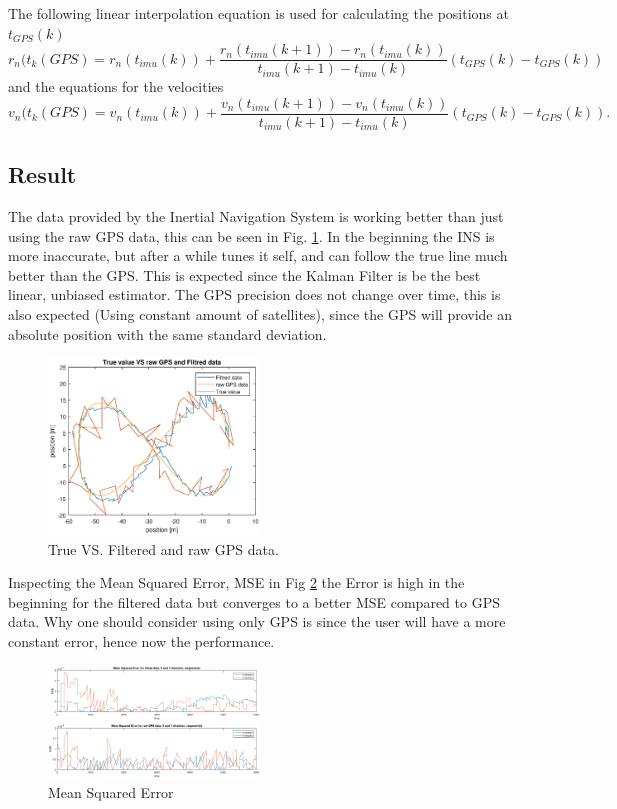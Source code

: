 The following linear interpolation equation is used for calculating the positions at $t_{GPS}(k)$
\begin{equation}
r_n(t_k(GPS) = r_n(t_{imu}(k)) + \frac{r_n(t_{imu}(k+1))-r_n(t_{imu}(k))}{t_{imu}(k+1)-t_{imu}(k)}(t_{GPS}(k)-t_{GPS}(k))
\end{equation}
 and the equations for the velocities 
 \begin{equation}
v_n(t_k(GPS) = v_n(t_{imu}(k)) + \frac{v_n(t_{imu}(k+1))-v_n(t_{imu}(k))}{t_{imu}(k+1)-t_{imu}(k)}(t_{GPS}(k)-t_{GPS}(k)).
\end{equation}
\subsection{Result}
The data provided by the Inertial Navigation System is working better than just using the raw GPS data, this can be seen in Fig. \ref{Fig:result_kalman}. In the beginning the INS is more inaccurate, but after a while tunes it self, and can follow the true line much better than the GPS. This is expected since the Kalman Filter is be the best linear, unbiased estimator.
The GPS precision does not change over time, this is also expected (Using constant amount of satellites), since the GPS will provide an absolute position with the same standard deviation.
\begin{figure}[H]
\centering
\includegraphics[width=0.5\textwidth]{Figures/result.eps}
\caption{True VS. Filtered and raw GPS data.}
\label{Fig:result_kalman}
\end{figure}

Inspecting the Mean Squared Error, MSE in Fig \ref{Fig:mse} the Error is high in the beginning for the filtered data but converges to a better MSE compared to GPS data. Why one should consider using only GPS is since the user will have a more constant error, hence now the performance. 
\begin{figure}[H]
\centering
\includegraphics[width=0.5\textwidth]{Figures/mse.eps}
\caption{Mean Squared Error}
\label{Fig:mse}
\end{figure}
